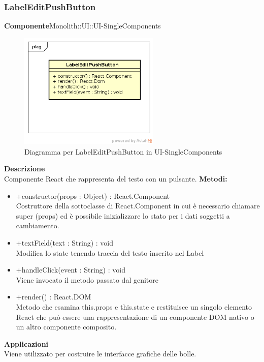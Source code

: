 \subsubsection{LabelEditPushButton}
\textbf{Componente}Monolith::UI::UI-SingleComponents\\
   \FloatBarrier
   \begin{figure}[ht]
   \centering
   \includegraphics[width=0.6\textwidth]{img/single-LabelEditPushButton}
   \caption{{Diagramma per LabelEditPushButton in UI-SingleComponents}}
\end{figure}
\FloatBarrier
\textbf{Descrizione}\\
Componente React che rappresenta del testo con un pulsante.
\textbf{Metodi:} \begin{itemize}\item +constructor(props : Object) : React.Component \\Costruttore della sottoclasse di React.Component in cui è necessario chiamare super (props) ed è possibile inizializzare lo stato per i dati soggetti a cambiamento.\item +textField(text : String) : void \\Modifica lo state tenendo traccia del testo inserito nel Label\item +handleClick(event : String) : void  \\Viene invocato il metodo passato dal genitore\item +render() : React.DOM \\Metodo che esamina this.props e this.state e restituisce un singolo elemento React che può essere una rappresentazione di un componente DOM nativo o un altro componente composito.\end{itemize} 


\textbf{Applicazioni}\\
Viene utilizzato per costruire le interfacce grafiche delle bolle. 


